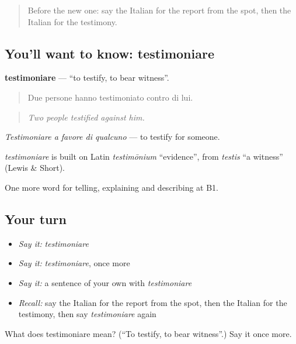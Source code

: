\begin{quote}
Before the new one: say the Italian for the report from the spot, then the Italian for the testimony.
\end{quote}

\subsection*{You'll want to know: testimoniare}
\textbf{testimoniare} — \textquotedblleft{}to testify, to bear witness\textquotedblright{}.

\begin{quote}
Due persone hanno testimoniato contro di lui.
\end{quote}

\begin{quote}
\emph{Two people testified against him.}
\end{quote}

\emph{Testimoniare a favore di qualcuno} — to testify for someone.

\begin{cousinweb}
\emph{testimoniare} is built on Latin \emph{testimōnium} \textquotedblleft{}evidence\textquotedblright{}, from \emph{testis} \textquotedblleft{}a witness\textquotedblright{} (Lewis \& Short).
\end{cousinweb}

\begin{grammarlens}[title={What you've built}]
One more word for telling, explaining and describing at B1.
\end{grammarlens}

\subsection*{Your turn}
\begin{itemize}
\raggedright
  \item \emph{Say it:} \emph{testimoniare}
  \item \emph{Say it:} \emph{testimoniare}, once more
  \item \emph{Say it:} a sentence of your own with \emph{testimoniare}
  \item \emph{Recall:} say the Italian for the report from the spot, then the Italian for the testimony, then say \emph{testimoniare} again
\end{itemize}

\begin{tcolorbox}[breakable,colback=teal!4,colframe=teal!35!black,title={Before you move on}]
What does testimoniare mean? (\textquotedblleft{}To testify, to bear witness\textquotedblright{}.) Say it once more.
\end{tcolorbox}
